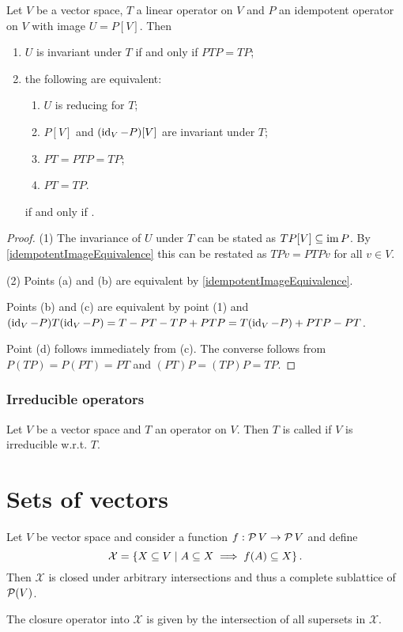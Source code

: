 \begin{lemma}
Let $V$ be a vector space, $T$ a linear operator on $V$ and $P$ an idempotent operator on $V$ with image $U = P[V]$. Then 
\begin{enumerate}
\item $U$ is invariant under $T$ \textup{if and only if} $PTP = TP$;
\item the following are equivalent:
\begin{enumerate}
\item $U$ is reducing for $T$;
\item $P[V]$ and $(\operatorname{id}_V - P)[V]$ are invariant under $T$;
\item $PT = PTP = TP$;
\item $PT = TP$.
\end{enumerate} \textup{if and only if} .
\end{enumerate}
\end{lemma}
\begin{proof}
(1) The invariance of $U$ under $T$ can be stated as $TP[V] \subseteq \operatorname{im} P$. By \ref{idempotentImageEquivalence} this can be restated as $TPv = PTPv$ for all $v\in V$.

(2) Points (a) and (b) are equivalent by \ref{idempotentImageEquivalence}.

Points (b) and (c) are equivalent by point (1) and $(\operatorname{id}_V - P)T(\operatorname{id}_V - P) = T - PT - TP + PTP = T(\operatorname{id}_V - P) + PTP - PT$.

Point (d) follows immediately from (c). The converse follows from $P(TP) = P(PT) = PT$ and $(PT)P = (TP)P = TP$.
\end{proof}

\subsubsection{Irreducible operators}
\begin{definition}
Let $V$ be a vector space and $T$ an operator on $V$. Then $T$ is called  if $V$ is irreducible w.r.t. $T$.
\end{definition}

\section{Sets of vectors}
\begin{proposition}
Let $V$ be vector space and consider a function $f: \operatorname{\mathcal{P}}{V} \to \operatorname{\mathcal{P}}{V}$ and define
\[ \mathcal{X} = \left\{ X\subseteq V \;\middle|\; A \subseteq X \implies f(A)\subseteq X \right\}. \]
Then $\mathcal{X}$ is closed under arbitrary intersections and thus a complete sublattice of $\operatorname{\mathcal{P}}(V)$.

The closure operator into $\mathcal{X}$ is given by the intersection of all supersets in $\mathcal{X}$.
\end{proposition}

